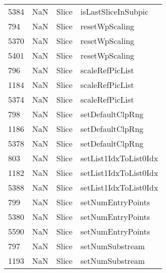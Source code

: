 \begin{tabular}{llll}
5384 &                   NaN &                      Slice &                       isLastSliceInSubpic \\
794  &                   NaN &                      Slice &                            resetWpScaling \\
5370 &                   NaN &                      Slice &                            resetWpScaling \\
5401 &                   NaN &                      Slice &                            resetWpScaling \\
796  &                   NaN &                      Slice &                           scaleRefPicList \\
1184 &                   NaN &                      Slice &                           scaleRefPicList \\
5374 &                   NaN &                      Slice &                           scaleRefPicList \\
798  &                   NaN &                      Slice &                          setDefaultClpRng \\
1186 &                   NaN &                      Slice &                          setDefaultClpRng \\
5378 &                   NaN &                      Slice &                          setDefaultClpRng \\
803  &                   NaN &                      Slice &                     setList1IdxToList0Idx \\
1182 &                   NaN &                      Slice &                     setList1IdxToList0Idx \\
5388 &                   NaN &                      Slice &                     setList1IdxToList0Idx \\
799  &                   NaN &                      Slice &                         setNumEntryPoints \\
5380 &                   NaN &                      Slice &                         setNumEntryPoints \\
5590 &                   NaN &                      Slice &                         setNumEntryPoints \\
797  &                   NaN &                      Slice &                           setNumSubstream \\
1193 &                   NaN &                      Slice &                           setNumSubstream \\

\end{tabular}
